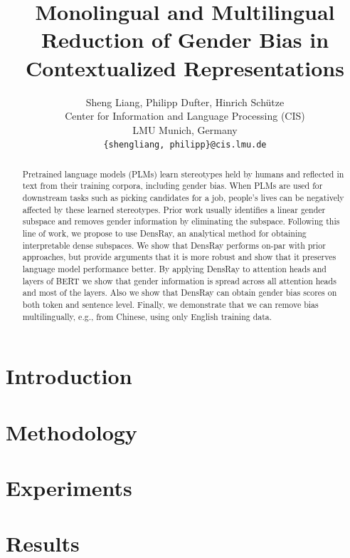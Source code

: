 \documentclass[11pt]{article}
\title{Monolingual and Multilingual Reduction of Gender Bias in Contextualized Representations}
\author{Sheng Liang, Philipp Dufter, Hinrich Sch\"utze\\
  Center for Information and Language Processing (CIS) \\
  LMU Munich, Germany\\
  {\tt \{shengliang, philipp\}@cis.lmu.de}}
\date{}
\begin{document}
\maketitle
\begin{abstract}
	
Pretrained language models (PLMs) learn stereotypes held by
humans and reflected in text from their training corpora,
including gender bias.  When PLMs are used for downstream
tasks such as picking candidates for a job, people's lives
can be negatively affected by these learned stereotypes.
Prior work usually identifies a linear gender subspace and
removes gender information by eliminating the
subspace. Following this line of work, we propose to use DensRay, an
analytical method for obtaining interpretable dense
subspaces. We show that DensRay performs on-par with prior
approaches, but provide arguments that it is more robust and show that it preserves language model performance better. By applying DensRay to attention heads and layers of BERT 
we show that gender information is spread across all attention heads and most of the layers. Also we show that DensRay can obtain gender bias scores on both token and sentence level. Finally,
we demonstrate that we can remove bias multilingually, e.g.,
from Chinese, using only English training data.
	
\end{abstract}


\section{Introduction}


\section{Methodology}


\section{Experiments}


\section{Results}


%
\end{document}

